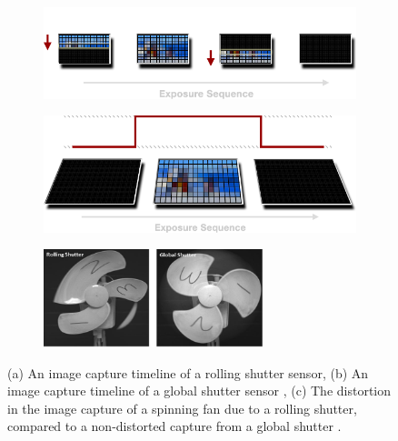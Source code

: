 \begin{figure}[h]
    \centering
    \begin{subfigure}{.32\textwidth}
        \centering
        \includegraphics[width=1\linewidth]{assets/rolling-shutter-timeline.png}
        \caption{}
        \label{subfig:rs_timeline}
    \end{subfigure}
    \hfill
    \begin{subfigure}{.32\textwidth}
        \centering
        \includegraphics[width=1\linewidth]{assets/global-shutter-timeline.png}
        \caption{}
        \label{subfig:gs_timeline}
    \end{subfigure}
    \hfill
    \begin{subfigure}{0.32\textwidth}
        \centering
        \includegraphics[width=0.7\textwidth]{assets/rolling-vs-global-shutter.jpeg}
        \caption{}
        \label{subfig:rs_vs_gs}
    \end{subfigure}
    \caption{(a) An image capture timeline of a rolling shutter sensor, (b) An image capture timeline of a global shutter sensor \cite{reddigitalcinemaGlobalRollingShutters}, (c) The distortion in the image capture of a spinning fan due to a rolling shutter, compared to a non-distorted capture from a global shutter \cite{RollingShutterVs}.}
    \label{fig:rs_vs_gs}
\end{figure}

